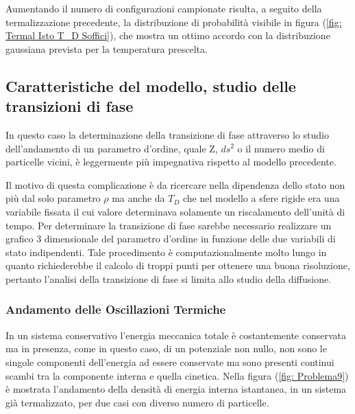 Aumentando il numero di configurazioni campionate risulta, a seguito della termalizzazione precedente, la distribuzione di probabilità visibile in figura (\ref{fig: Termal Isto T_D Soffici}), che mostra un ottimo accordo con la distribuzione gaussiana prevista per la temperatura prescelta.


\FloatBarrier 
\subsection{Caratteristiche del modello, studio delle transizioni di fase}
In questo caso la determinazione della transizione di fase attraverso lo studio dell'andamento di un parametro d'ordine, quale Z, $ds^2$ o il numero medio di particelle vicini, è leggermente più impegnativa rispetto al modello precedente.

Il motivo di questa complicazione è da ricercare nella dipendenza dello stato non più dal solo parametro $\rho$ ma anche da $T_D$ che nel modello a sfere rigide era  una variabile fissata il cui valore determinava solamente un riscalamento dell'unità di tempo.
Per determinare la transizione di fase sarebbe necessario realizzare un grafico 3 dimensionale del parametro d'ordine in funzione delle due variabili di stato indipendenti. Tale procedimento è computazionalmente molto lungo in quanto richiederebbe il calcolo di troppi punti per ottenere una buona risoluzione, pertanto l'analisi della transizione di fase si limita allo studio della diffusione.


\subsubsection{Andamento delle Oscillazioni Termiche}
In un sistema conservativo l'energia meccanica totale è costantemente conservata ma in presenza, come in questo caso,  di un potenziale non nullo, non sono le singole componenti dell'energia ad essere conservate ma sono presenti continui scambi tra la componente interna e quella cinetica.
Nella figura (\ref{fig: Problema9}) è mostrata l'andamento della densità di energia interna istantanea, in un sistema già termalizzato, per due casi con diverso numero di particelle.

